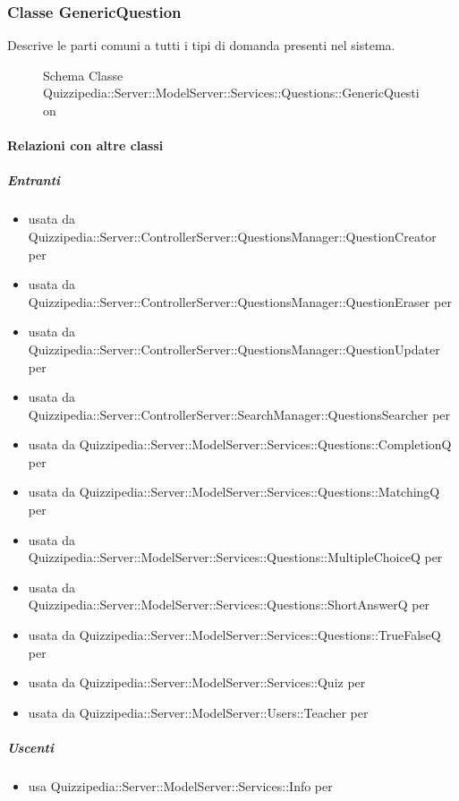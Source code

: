 \subsubsection{Classe GenericQuestion}
Descrive le parti comuni a tutti i tipi di domanda presenti nel sistema.
\begin{figure}[H]
\centering
\noindent{}
\caption[Schema Classe GenericQuestion]{Schema Classe Quizzipedia::Server::ModelServer::Services::Questions::GenericQuestion}
\end{figure}
\paragraph{Relazioni con altre classi}
\subparagraph{Entranti}
\begin{itemize}
\item usata da Quizzipedia::Server::ControllerServer::QuestionsManager::QuestionCreator per 
\item usata da Quizzipedia::Server::ControllerServer::QuestionsManager::QuestionEraser per 
\item usata da Quizzipedia::Server::ControllerServer::QuestionsManager::QuestionUpdater per 
\item usata da Quizzipedia::Server::ControllerServer::SearchManager::QuestionsSearcher per 
\item usata da Quizzipedia::Server::ModelServer::Services::Questions::CompletionQ per 
\item usata da Quizzipedia::Server::ModelServer::Services::Questions::MatchingQ per 
\item usata da Quizzipedia::Server::ModelServer::Services::Questions::MultipleChoiceQ per 
\item usata da Quizzipedia::Server::ModelServer::Services::Questions::ShortAnswerQ per 
\item usata da Quizzipedia::Server::ModelServer::Services::Questions::TrueFalseQ per 
\item usata da Quizzipedia::Server::ModelServer::Services::Quiz per 
\item usata da Quizzipedia::Server::ModelServer::Users::Teacher per 
\end{itemize}
\subparagraph{Uscenti}
\begin{itemize}
\item usa Quizzipedia::Server::ModelServer::Services::Info per 
\end{itemize}
